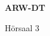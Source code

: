 \documentclass[a4paper]{article}
\begin{document}
\printGenericVSLHeader
\begin{center}
\begin{vsltext}{3cm}{4cm}

   \vspace{0.5cm} 

    \textbf{ARW-DT} 

    \vspace{1.5cm}

    Hörsaal 3

\end{vsltext}

\end{center}
\end{document}
